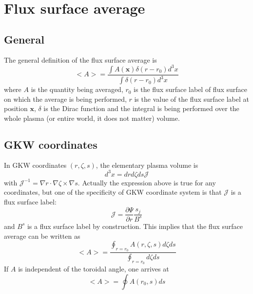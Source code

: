 \section{Flux surface average \label{sec.fsa}}
\subsection{General}
The general definition of the flux surface average is
\begin{equation}
 <A> = \frac{\int A(\mathbf{x}) \delta(r-r_0) d^3{x}}{\int\delta(r-r_0) d^3{x}}
\end{equation}
where $A$ is the quantity being averaged, $r_0$ is the flux surface label of flux surface on which the average is being 
performed, $r$ is the value of the flux surface label at position $\mathbf{x}$, $\delta$ is the Dirac function and the integral is being performed over the whole plasma (or entire world, it does not matter) volume.  

\subsection{GKW coordinates}
In GKW coordinates $(r,\zeta,s)$, the elementary plasma volume is 
\begin{equation}
 d^3 x = dr d\zeta ds \mathcal{J}
\end{equation}
with $\mathcal{J}^{-1} = \nabla r \cdot \nabla \zeta \times \nabla s$. Actually the expression above is true for any coordinates, but
one of the specificity of GKW coordinate system is that $\mathcal{J}$ is a flux surface label:
\begin{equation}
 \mathcal{J}= \frac{\partial\Psi}{\partial r} \frac{s_j}{B^s}
\end{equation}
and $B^s$ is a flux surface label by construction. This implies that the flux surface average can be written as
\begin{equation}
 <A> = \frac{\oint_{r=r_0} A(r,\zeta,s) d\zeta ds}{\oint_{r=r_0} d\zeta ds}
\end{equation}
If $A$ is independent of the toroidal angle, one arrives at
\begin{equation}
 <A> = \oint A(r_0,s) ds
\end{equation}

